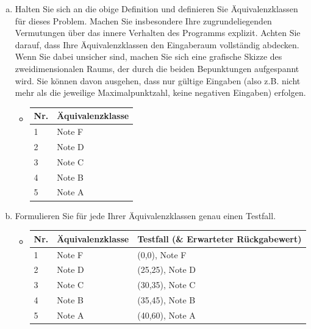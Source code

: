 \begin{enumerate}[a)]
    \item Halten Sie sich an die obige Definition und definieren Sie Äquivalenzklassen für dieses Problem. Machen Sie insbesondere Ihre zugrundeliegenden Vermutungen über das innere Verhalten des Programms explizit. Achten Sie darauf, dass Ihre Äquivalenzklassen den Eingaberaum vollständig abdecken. Wenn Sie dabei unsicher sind, machen Sie sich eine grafische Skizze des zweidimensionalen Raums, der durch die beiden Bepunktungen aufgespannt wird. Sie können davon ausgehen, dass nur gültige Eingaben (also z.B. nicht mehr als die jeweilige Maximalpunktzahl, keine negativen Eingaben) erfolgen.
    \begin{itemize}
         \item[] \begin{tabular}{|l|l|}
            \hline  
            Nr. &  Äquivalenzklasse \\ \hline  
            1 & Note F \\ \hline 
            2 & Note D \\ \hline 
            3 & Note C \\ \hline 
            4 & Note B \\ \hline 
            5 & Note A \\ \hline 
        \end{tabular}
    \end{itemize}    

    
    
    
    \item Formulieren Sie für jede Ihrer Äquivalenzklassen genau einen Testfall. 
    \begin{itemize}
        \item[] \begin{tabular}{|l|l|l|}
            \hline
            Nr. &  Äquivalenzklasse & Testfall (\& Erwarteter Rückgabewert)\\ \hline  
            1 & Note F & (0,0), Note F\\ \hline 
            2 & Note D & (25,25), Note D\\ \hline 
            3 & Note C & (30,35), Note C\\ \hline 
            4 & Note B & (35,45), Note B\\ \hline 
            5 & Note A & (40,60), Note A\\ \hline 
        \end{tabular}
    \end{itemize}    
    
\end{enumerate}
